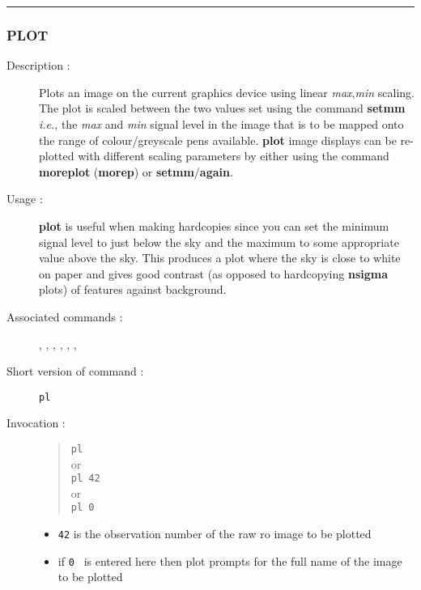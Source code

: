\hrule
\subsubsection*{\label{PLOT}PLOT}

\begin{description}

\item[Description :] Plots an image on the current graphics device
using linear {\it max},{\it min} scaling.  The plot is scaled between
the two values set using the command {\bf setmm} \emph{i.e.}, the {\it max}
and {\it min} signal level in the image that is to be mapped onto the
range of colour/greyscale pens available.  {\bf plot} image displays can be
re-plotted with different scaling parameters by either using the
command {\bf moreplot} ({\bf morep}) or {\bf setmm}/{\bf again}.

\item[Usage :] {\bf plot} is useful when making hardcopies since you can set
the minimum signal level to just below the sky and the maximum to some
appropriate value above the sky.  This produces a plot where the sky is
close to white on paper and gives good contrast (as opposed to
hardcopying {\bf nsigma} plots) of features against background.

\item[Associated commands :] {\tt {}},
{\tt {}}, {\tt {}},
{\tt {}}, {\tt {}},
{\tt {}}, {\tt {}}

\item[Short version of command :] {\tt pl}
\item[Invocation :]

\begin{quote}{\tt  pl }\\
or \\
{\tt pl 42 }\\
or \\
{\tt pl 0 }
\end{quote}

\begin{itemize}
\item {\tt 42} is the observation number of the raw {\sc ro} image to be
plotted
\item if {\tt 0 } is entered here then plot prompts for the full name
 of the image to be plotted
\end{itemize}

\end{description}

